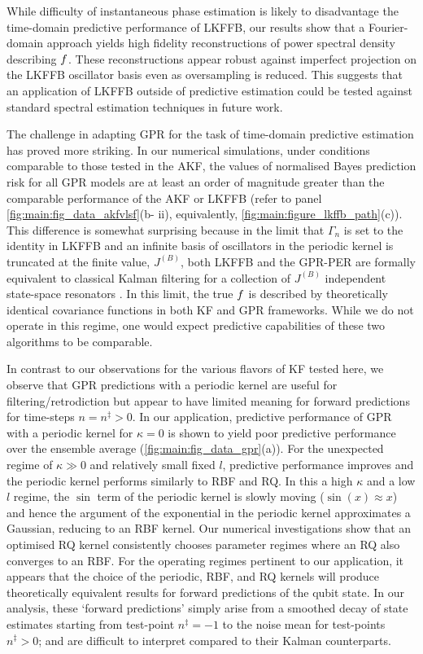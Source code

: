 While difficulty of instantaneous phase estimation is likely to disadvantage the time-domain predictive performance of LKFFB, our results show that a Fourier-domain approach yields high fidelity reconstructions of power spectral density describing $f$. These reconstructions appear robust against imperfect projection on the LKFFB oscillator basis even as oversampling is reduced. This suggests that an application of LKFFB outside of predictive estimation could be tested against standard spectral estimation techniques in future work.

The challenge in adapting GPR for the task of time-domain predictive estimation has proved more striking.  In our numerical simulations, under conditions comparable to those tested in the AKF, the values of normalised Bayes prediction risk for all GPR models are at least an order of magnitude greater than the comparable performance of the AKF or LKFFB (refer to panel \cref{fig:main:fig_data_akfvlsf}(b- ii), equivalently, \cref{fig:main:figure_lkffb_path}(c)). This difference is somewhat surprising because in the limit that $\Gamma_n$ is set to the identity in LKFFB and an infinite basis of oscillators in the periodic kernel is truncated at the finite value, $J^{(B)}$, both LKFFB and the GPR-PER are formally equivalent to classical Kalman filtering for a collection of $J^{(B)}$ independent state-space resonators \cite{solin2014explicit}. In this limit, the true $f$ is described by theoretically identical covariance functions in both KF and GPR frameworks. While we do not operate in this regime, one would expect predictive capabilities of these two algorithms to be comparable. 

In contrast to our observations for the various flavors of KF tested here, we observe that GPR predictions with a periodic kernel are useful for filtering/retrodiction but appear to have limited meaning for forward predictions for time-steps $n= n^\ddagger >0$.  In our application, predictive performance of GPR with a periodic kernel for $\kappa=0$ is shown to yield poor predictive performance over the ensemble average (\cref{fig:main:fig_data_gpr}(a)). For the unexpected regime of $\kappa \gg 0$ and relatively small fixed $l$, predictive performance improves and the periodic kernel performs similarly to RBF and RQ. In this a high $\kappa$ and a low $l$ regime, the $\sin$ term of the periodic kernel is slowly moving ($\sin(x) \approx x$) and hence the argument of the exponential in the periodic kernel approximates a Gaussian, reducing to an RBF kernel. Our numerical investigations show that an optimised RQ kernel consistently chooses parameter regimes where an RQ also converges to an RBF.  For the operating regimes pertinent to our application, it appears that the choice of the periodic, RBF, and RQ kernels will produce theoretically equivalent results for forward predictions of the qubit state. In our analysis, these `forward predictions' simply arise from a smoothed decay of state estimates starting from test-point $n^\ddagger=-1$ to the noise mean for test-points $n^\ddagger>0$; and are difficult to interpret compared to their Kalman counterparts.

